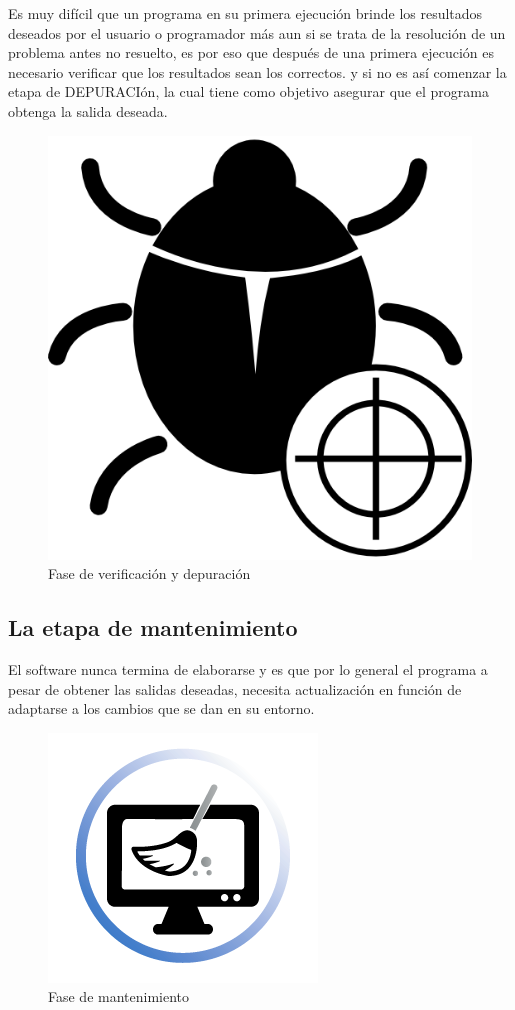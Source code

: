 \documentclass[a4paper,12pt,spanish]{article}
\begin{document}
Es muy difícil que un programa en su primera ejecución brinde los
resultados deseados por el usuario o programador más aun si se trata
de la resolución de un problema  antes no resuelto, es por eso que
después de una primera ejecución es necesario verificar que los
resultados sean los correctos. y si no es así comenzar la etapa de
DEPURACIón, la cual tiene como objetivo asegurar que el programa
obtenga la salida deseada.
\begin{figure}[H]
  \centering
  \includegraphics[scale=0.2]{debugging}
  \caption{Fase de verificación y depuración}
  \label{fig:documentacion}
\end{figure}


\subsection{La etapa de mantenimiento}
\label{sec:la-etapa-de-3}

El software nunca termina de elaborarse  y es que por lo general el
programa a pesar de obtener las salidas deseadas, necesita
actualización en función de adaptarse a los cambios que se dan en su
entorno.
\begin{figure}[H]
  \centering
  \includegraphics[scale=0.3]{MantenimientoSoftware}
  \caption{Fase de mantenimiento}
  \label{fig:documentacion}
\end{figure}
\end{document}

